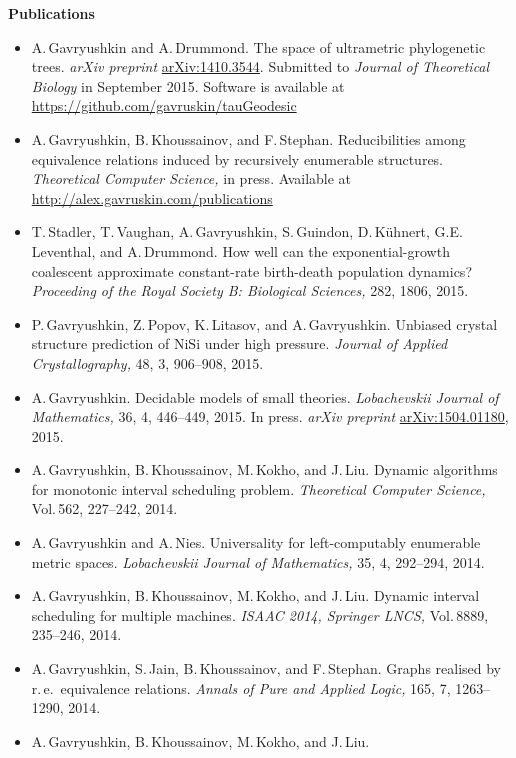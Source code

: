 \documentclass[12pt]{article}
\begin{document}
\centerline{\bf Publications}
\begin{itemize}
\item A.\,Gavryushkin and A.\,Drummond.
	The space of ultrametric phylogenetic trees.
	{\em arXiv preprint} \href{http://arxiv.org/abs/1410.3544}{arXiv:1410.3544}.
	Submitted to {\em Journal of Theoretical Biology} in September 2015.
	Software is available at
	\href{https://github.com/gavruskin/tauGeodesic}{https://github.com/gavruskin/tauGeodesic}
\item A.\,Gavryushkin, B.\,Khoussainov, and F.\,Stephan.
	Reducibilities among equivalence relations induced by recursively enumerable structures.
	{\em Theoretical Computer Science,} in press.
	Available at \href{http://alex.gavruskin.com/publications}{http://alex.gavruskin.com/publications}
\item T.\,Stadler, T.\,Vaughan, A.\,Gavryushkin, S.\,Guindon, D.\,K\"uhnert, G.E.\,Leventhal, and A.\,Drummond.
	How well can the exponential-growth coalescent approximate constant-rate birth-death population dynamics?
	{\em Proceeding of the Royal Society B: Biological Sciences,} 282, 1806, 2015.
\item P.\,Gavryushkin, Z.\,Popov, K.\,Litasov, and A.\,Gavryushkin.
	Unbiased crystal structure prediction of $\mathrm{NiSi}$ under high pressure.
	{\em Journal of Applied Crystallography,} 48, 3, 906--908, 2015.
\item A.\,Gavryushkin.
	Decidable models of small theories.
	{\em Lobachevskii Journal of Mathematics,} 36, 4, 446--449, 2015.
	In press.
	{\em arXiv preprint} \href{http://arxiv.org/abs/1504.01180}{arXiv:1504.01180}, 2015.
\item A.\,Gavryushkin, B.\,Khoussainov, M.\,Kokho, and J.\,Liu.
	Dynamic algorithms for monotonic interval scheduling problem.
	{\em Theoretical Computer Science,} Vol.\,562, 227--242, 2014.
\item A.\,Gavryushkin and A.\,Nies.
	Universality for left-computably enumerable  metric spaces.
	{\em Lobachevskii Journal of Mathematics,} 35, 4, 292--294, 2014.
\item A.\,Gavryushkin, B.\,Khoussainov, M.\,Kokho, and J.\,Liu.
	Dynamic interval scheduling for multiple machines.
	{\em ISAAC 2014, Springer LNCS,} Vol.\,8889, 235--246, 2014.
\item A.\,Gavryushkin, S.\,Jain, B.\,Khoussainov, and F.\,Stephan.
	Graphs realised by r.\,e.\ equivalence relations.
	{\em Annals of Pure and Applied Logic,} 165, 7, 1263--1290, 2014.
\item A.\,Gavryushkin, B.\,Khoussainov, M.\,Kokho, and J.\,Liu.

\end{itemize}
\end{document}
